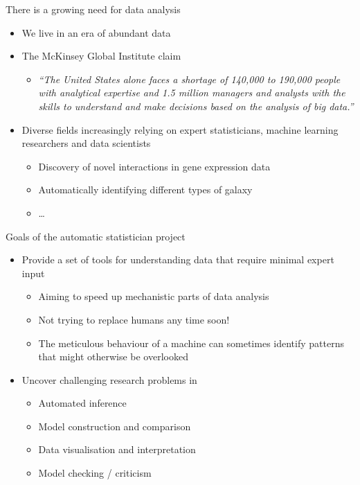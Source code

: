 \begin{frame}{There is a growing need for data analysis}
  \begin{itemize}
    \item We live in an era of abundant data
    \vspace{\baselineskip}
    \item The McKinsey Global Institute claim
    \begin{itemize}
      \item \emph{``The United States alone faces a shortage of 140,000 to 190,000 people with analytical expertise and 1.5 million managers and analysts with the skills to understand and make decisions based on the analysis of big data.''}
    \end{itemize}
    \vspace{\baselineskip}
    \item Diverse fields increasingly relying on expert statisticians, machine learning researchers and data scientists \eg
    \begin{itemize}
       \item Discovery of novel interactions in gene expression data
       \item Automatically identifying different types of galaxy
       \item \ldots
     \end{itemize}
  \end{itemize}
\end{frame}

\begin{frame}{Goals of the automatic statistician project}
  \begin{itemize}
    \item Provide a set of tools for understanding data that require minimal expert input
    \begin{itemize}
      \item Aiming to speed up mechanistic parts of data analysis
      \item Not trying to replace humans any time soon!
      \item The meticulous behaviour of a machine can sometimes identify patterns that might otherwise be overlooked
    \end{itemize}
    \vspace{\baselineskip}
    \item Uncover challenging research problems in \eg
    \begin{itemize}
      \item Automated inference
      \item Model construction and comparison
      \item Data visualisation and interpretation
      \item Model checking / criticism
    \end{itemize}
  \end{itemize}
\end{frame}

